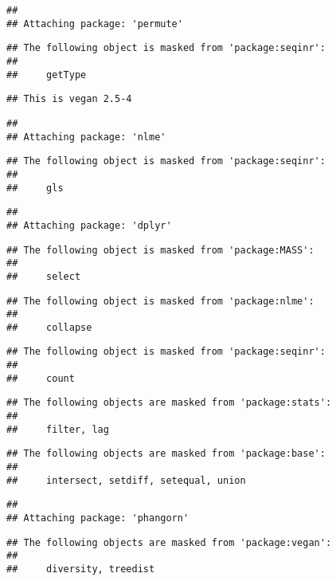 \documentclass[]{article}
\begin{document}
\begin{verbatim}
## 
## Attaching package: 'permute'
\end{verbatim}

\begin{verbatim}
## The following object is masked from 'package:seqinr':
## 
##     getType
\end{verbatim}

\begin{verbatim}
## This is vegan 2.5-4
\end{verbatim}

\begin{verbatim}
## 
## Attaching package: 'nlme'
\end{verbatim}

\begin{verbatim}
## The following object is masked from 'package:seqinr':
## 
##     gls
\end{verbatim}

\begin{verbatim}
## 
## Attaching package: 'dplyr'
\end{verbatim}

\begin{verbatim}
## The following object is masked from 'package:MASS':
## 
##     select
\end{verbatim}

\begin{verbatim}
## The following object is masked from 'package:nlme':
## 
##     collapse
\end{verbatim}

\begin{verbatim}
## The following object is masked from 'package:seqinr':
## 
##     count
\end{verbatim}

\begin{verbatim}
## The following objects are masked from 'package:stats':
## 
##     filter, lag
\end{verbatim}

\begin{verbatim}
## The following objects are masked from 'package:base':
## 
##     intersect, setdiff, setequal, union
\end{verbatim}

\begin{verbatim}
## 
## Attaching package: 'phangorn'
\end{verbatim}

\begin{verbatim}
## The following objects are masked from 'package:vegan':
## 
##     diversity, treedist
\end{verbatim}
\end{document}
